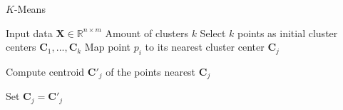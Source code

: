 \documentclass[./main.tex]{subfiles}
\begin{document}
\begin{algorithm}[htbp]
    \caption{$K$-Means \cite{DS_manual}}
    \begin{algorithmic}[1]
        \Require Input data $\bm{X} \in \mathbb{R}^{n \times m}$
        \Require Amount of clusters $k$
        \State Select $k$ points as initial cluster centers $\bm{C}_1, ..., \bm{C}_k$
                \State Map point $p_i$ to its nearest cluster center $\bm{C}_j$
            \EndFor

                \State Compute centroid $\bm{C}'_j$ of the points nearest $\bm{C}_j$
            \EndFor

                \State Set $\bm{C}_j = \bm{C}'_j$
            \EndFor
        \EndWhile
    \end{algorithmic}
    \label{Algorithm:KMeans}
\end{algorithm}
\end{document}
